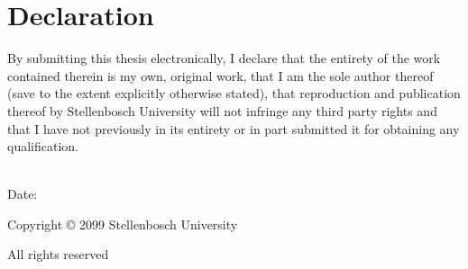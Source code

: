 \thispagestyle{plain}

\vspace*{5pt}

\section*{Declaration}

\vspace{20pt}

By submitting this thesis electronically, I declare that the entirety of the work contained
therein is my own, original work, that I am the sole author thereof (save to the extent explicitly
otherwise stated), that reproduction and publication thereof by Stellenbosch University will
not infringe any third party rights and that I have not previously in its entirety or in part
submitted it for obtaining any qualification.


\vspace{35pt}

\noindent
\begin{minipage}{.5\textwidth}
    \noindent
    \phantom{Date:}~\hfill{}\hfill\mbox{}\\[-.5\baselineskip]
    Date:~ \dotfill\mbox{}\par
\end{minipage}

\vspace{35pt}

\vfill

    Copyright © 2099 Stellenbosch University\par
    All rights reserved

\vspace{35pt}

